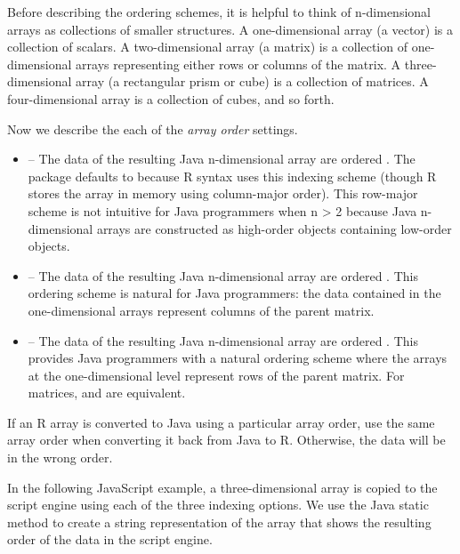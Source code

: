Before describing the ordering schemes, it is helpful to think of n-dimensional arrays as collections of smaller structures. A one-dimensional array (a vector) is a collection of scalars. A two-dimensional array (a matrix) is a collection of one-dimensional arrays representing either rows or columns of the matrix. A three-dimensional array (a rectangular prism or cube) is a collection of matrices. A four-dimensional array is a collection of cubes, and so forth. 

Now we describe the each of the \textit{array order} settings.

\begin{itemize}
\item {} -- The data of the resulting Java n-dimensional array are ordered \newline {}. The  package defaults to  because R syntax uses this indexing scheme (though R stores the array in memory using column-major order). This row-major scheme is not intuitive for Java programmers when n > 2 because Java n-dimensional arrays are constructed as high-order objects containing low-order objects.

\item {} -- The data of the resulting Java n-dimensional array are ordered \newline {}. This ordering scheme is natural for Java programmers: the data contained in the one-dimensional arrays represent columns of the parent matrix.

\item {} -- The data of the resulting Java n-dimensional array are ordered \newline {}. This provides Java programmers with a natural ordering scheme where the arrays at the one-dimensional level represent rows of the parent matrix. For matrices,  and  are equivalent.

\end{itemize}

 If an R array is converted to Java using a particular array order, use the same array order when converting it back from Java to R. Otherwise, the data will be in the wrong order.

In the following JavaScript example, a three-dimensional array is copied to the script engine using each of the three indexing options. We use the Java static method  to create a string representation of the array that shows the resulting order of the data in the script engine.


